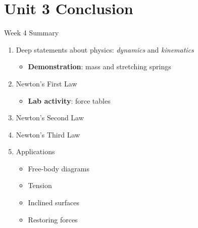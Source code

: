\documentclass{beamer}
\begin{document}
\section{Unit 3 Conclusion}

\begin{frame}{Week 4 Summary}
\begin{enumerate}
\item Deep statements about physics: \textit{dynamics} and \textit{kinematics}
\begin{itemize}
\item \textbf{Demonstration}: mass and stretching springs
\end{itemize}
\item Newton's \alert{First Law}
\begin{itemize}
\item \textbf{Lab activity}: force tables
\end{itemize}
\item Newton's \alert{Second Law}
\item Newton's \alert{Third Law}
\item Applications
\begin{itemize}
\item Free-body diagrams
\item Tension
\item Inclined surfaces
\item Restoring forces
\end{itemize}
\end{enumerate}
\end{frame}
\end{document}
